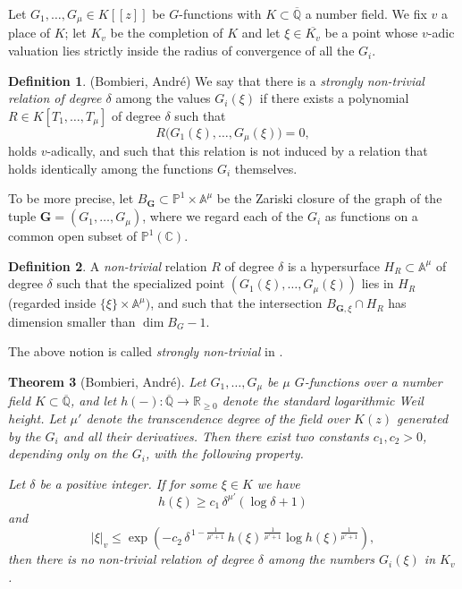 \documentclass[10pt]{article}
\numberwithin{equation}{section}
\theoremstyle{plain}
\newtheorem{thm}{Theorem}[section]
\theoremstyle{definition}
\newtheorem{defn}[thm]{Definition}
\theoremstyle{remark}
\newcommand{\C}{\mathbb{C}}
\newcommand{\Qbar}{\overline{\mathbb{Q}}}
\begin{document}
Let $G_1,\dots,G_{\mu} \in K[[z]]$ be $G$-functions with $K \subset \Qbar$ a number field. We fix $v$ a place of $K$; let $K_{v}$ be the completion of $K$ and let $\xi \in \overline{K_{v}}$ be a point whose $v$-adic valuation lies strictly inside the radius of convergence of all the $G_{i}$. 

\begin{defn}(Bombieri, Andr\'e) 
We say that there is a \emph{strongly non-trivial relation of degree $\delta$} among the values $G_i(\xi)$ if there exists a polynomial $R \in K[T_1,\dots,T_{\mu}]$ of degree $\delta$ such that
\[
R\bigl(G_1(\xi),\dots,G_{\mu}(\xi)\bigr)=0,
\]
holds $v$-adically, and such that this relation is not induced by a relation that holds identically among the functions $G_i$ themselves.
\end{defn}

To be more precise, let $B_{\mathbf{G}} \subset \mathbb{P}^1 \times \mathbb{A}^{\mu}$ be the Zariski closure of the graph of the tuple $\mathbf{G} = (G_{1}, \hdots, G_{\mu})$, where we regard each of the $G_{i}$ as functions on a common open subset of $\mathbb{P}^1(\C)$. 
\begin{defn}
\label{nontrivialreldef}
A \emph{non-trivial} relation $R$ of degree $\delta$ is a hypersurface $H_{R} \subset \mathbb{A}^{\mu}$ of degree $\delta$ such that the specialized point $(G_1(\xi), \hdots, G_{\mu}(\xi))$ lies in $H_R$ (regarded inside $\{ \xi \} \times \mathbb{A}^{\mu})$, and such that the intersection $B_{\mathbf{G},\xi} \cap H_{R}$ has dimension smaller than $\dim B_{G} - 1$. 
\end{defn}
\noindent The above notion is called \emph{strongly non-trivial} in \cite{zbMATH00041964}.

\medskip

\begin{thm}[Bombieri, André]\label{thm:bombieri}
Let $G_1,\dots,G_{\mu}$ be $\mu$ $G$-functions over a number field $K \subset \Qbar$, and let $h(-) : \Qbar \to \mathbb{R}_{\geq 0}$ denote the standard logarithmic Weil height. Let $\mu'$ denote the transcendence degree of the field over $K(z)$ generated by the $G_i$ and all their derivatives. Then there exist two constants $c_1,c_2>0$, depending only on the $G_i$, with the following property.

Let $\delta$ be a positive integer. If for some $\xi \in K$ we have
\begin{equation}
\label{bomb1}
    h(\xi) \ge c_1\, \delta^{\mu'}(\log \delta +1)
\end{equation}
and
\begin{equation}
\label{bomb2}
 |\xi|_v \le \exp\!\left(-c_2\, \delta^{\,1-\frac{1}{\mu'+1}}\, h(\xi)^{\,\frac{1}{\mu'+1}} \log h(\xi)^\frac{1}{\mu'+1}\right),   
\end{equation}
then there is no non-trivial relation of degree $\delta$ among the numbers $G_i(\xi)$ in $K_v$.
\end{thm}
\end{document}
